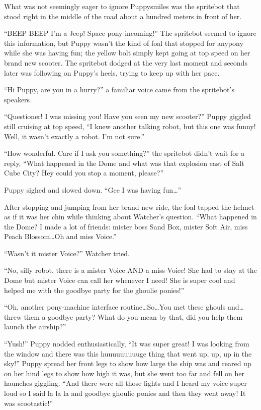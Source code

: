 What was not seemingly eager to ignore Puppysmiles was the spritebot that stood right in the middle of the road about a hundred meters in front of her.

``BEEP BEEP I'm a Jeep! Space pony incoming!'' The spritebot seemed to ignore this information, but Puppy wasn't the kind of foal that stopped for anypony while she was having fun; the yellow bolt simply kept going at top speed on her brand new scooter. The spritebot dodged at the very last moment and seconds later was following on Puppy's heels, trying to keep up with her pace.

``Hi Puppy, are you in a hurry?'' a familiar voice came from the spritebot's speakers.

``Questioner! I was missing you! Have you seen my new scooter?'' Puppy giggled still cruising at top speed, ``I knew another talking robot, but this one was funny! Well, it wasn't exactly a robot. I'm not sure.''

``How wonderful. Care if I ask you something?'' the spritebot didn't wait for a reply, ``What happened in the Dome and what was that explosion east of Salt Cube City? Hey could you stop a moment, please?''

Puppy sighed and slowed down. ``Gee I was having fun\dots''

After stopping and jumping from her brand new ride, the foal tapped the helmet as if it was her chin while thinking about Watcher's question. ``What happened in the Dome? I made a lot of friends: mister boss Sand Box, mister Soft Air, miss Peach Blossom\dots Oh and miss Voice.''

``Wasn't it mister Voice?'' Watcher tried.

``No, silly robot, there is a mister Voice AND a miss Voice! She had to stay at the Dome but mister Voice can call her whenever I need! She is super cool and helped me with the goodbye party for the ghoulie ponies!''

``Oh, another pony-machine interface routine\dots So\dots You met these ghouls and\dots threw them a goodbye party? What do you mean by that, did you help them launch the airship?''

``Yush!'' Puppy nodded enthusiastically, ``It was super great! I was looking from the window and there was this huuuuuuuuuge thing that went up, up, up in the sky!'' Puppy spread her front legs to show how large the ship was and reared up on her hind legs to show how high it was, but she went too far and fell on her haunches giggling. ``And there were all those lights and I heard my voice super loud so I said la la la and goodbye ghoulie ponies and then they went away! It was scootastic!''

